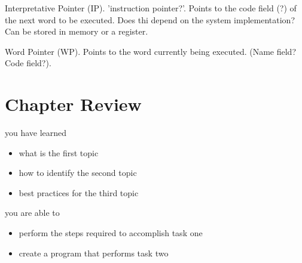Interpretative Pointer (IP). 'instruction pointer?'. Points to the code field (?) of the next word to be executed. Does thi depend on the system implementation? Can be stored in memory or a register.

Word Pointer (WP). Points to the word currently being executed. (Name field? Code field?).
\section{Chapter Review}
\begin{kaobox}[frametitle=Chapter Review]
you have learned
\begin{itemize}
	\item what is the first topic
	\item how to identify the second topic
        \item best practices for the third topic
\end{itemize}

you are able to
\begin{itemize}
        \item perform the steps required to accomplish task one
        \item create a program that performs task two
\end{itemize}
\end{kaobox}






